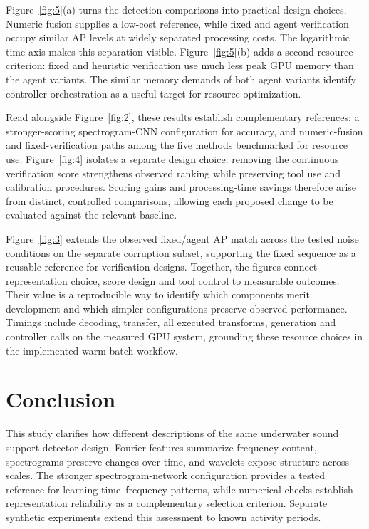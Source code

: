 \documentclass[11pt,letterpaper]{article}
\begin{document}
Figure~\ref{fig:5}(a) turns the detection comparisons into practical design choices. Numeric fusion supplies a low-cost reference, while fixed and agent verification occupy similar AP levels at widely separated processing costs. The logarithmic time axis makes this separation visible. Figure~\ref{fig:5}(b) adds a second resource criterion: fixed and heuristic verification use much less peak GPU memory than the agent variants. The similar memory demands of both agent variants identify controller orchestration as a useful target for resource optimization.\par

Read alongside Figure~\ref{fig:2}, these results establish complementary references: a stronger-scoring spectrogram-CNN configuration for accuracy, and numeric-fusion and fixed-verification paths among the five methods benchmarked for resource use. Figure~\ref{fig:4} isolates a separate design choice: removing the continuous verification score strengthens observed ranking while preserving tool use and calibration procedures. Scoring gains and processing-time savings therefore arise from distinct, controlled comparisons, allowing each proposed change to be evaluated against the relevant baseline.\par

Figure~\ref{fig:3} extends the observed fixed/agent AP match across the tested noise conditions on the separate corruption subset, supporting the fixed sequence as a reusable reference for verification designs. Together, the figures connect representation choice, score design and tool control to measurable outcomes. Their value is a reproducible way to identify which components merit development and which simpler configurations preserve observed performance. Timings include decoding, transfer, all executed transforms, generation and controller calls on the measured GPU system, grounding these resource choices in the implemented warm-batch workflow.\par

\clearpage

\section{Conclusion}

This study clarifies how different descriptions of the same underwater sound support detector design. Fourier features summarize frequency content, spectrograms preserve changes over time, and wavelets expose structure across scales. The stronger spectrogram-network configuration provides a tested reference for learning time--frequency patterns, while numerical checks establish representation reliability as a complementary selection criterion. Separate synthetic experiments extend this assessment to known activity periods.\par
\end{document}
